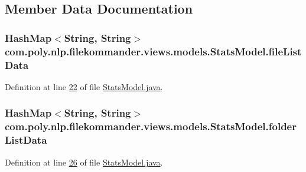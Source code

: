 \subsection{Member Data Documentation}
\hypertarget{classcom_1_1poly_1_1nlp_1_1filekommander_1_1views_1_1models_1_1_stats_model_a7f136c002fe9865658d95f070a47fc10}{
\subsubsection[{file\-List\-Data}]{\setlength{\rightskip}{0pt plus 5cm}Hash\-Map$<$String, String$>$ com.\-poly.\-nlp.\-filekommander.\-views.\-models.\-Stats\-Model.\-file\-List\-Data\hspace{0.3cm}{\ttfamily [private]}}}\label{classcom_1_1poly_1_1nlp_1_1filekommander_1_1views_1_1models_1_1_stats_model_a7f136c002fe9865658d95f070a47fc10}


Definition at line \hyperlink{L22}{22} of file \hyperlink{}{Stats\-Model.\-java}.

\hypertarget{classcom_1_1poly_1_1nlp_1_1filekommander_1_1views_1_1models_1_1_stats_model_af8cefc08e228065ab54db3f1f9db7b9e}{
\subsubsection[{folder\-List\-Data}]{\setlength{\rightskip}{0pt plus 5cm}Hash\-Map$<$String, String$>$ com.\-poly.\-nlp.\-filekommander.\-views.\-models.\-Stats\-Model.\-folder\-List\-Data\hspace{0.3cm}{\ttfamily [private]}}}\label{classcom_1_1poly_1_1nlp_1_1filekommander_1_1views_1_1models_1_1_stats_model_af8cefc08e228065ab54db3f1f9db7b9e}


Definition at line \hyperlink{L26}{26} of file \hyperlink{}{Stats\-Model.\-java}.

